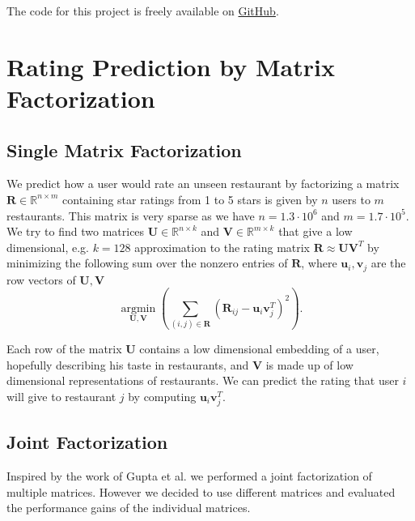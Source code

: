 \documentclass[a4paper]{article}
\begin{document}
The code for this project is freely available on \href{https://github.com/n-gao/yelp-group-recommender}{GitHub}.


\section{Rating Prediction by Matrix Factorization}\label{sec:MatrixFactorization}

\subsection{Single Matrix Factorization}
We predict how a user would rate an unseen restaurant by factorizing a matrix $\mathbf{R} \in \mathbb{R}^{n \times m}$ containing star ratings from 1 to 5 stars is given by $n$ users to $m$ restaurants. This matrix is very sparse as we have $n = 1.3 \cdot 10^6$ and $m = 1.7 \cdot 10^5$.
We try to find two matrices $\mathbf{U} \in \mathbb{R}^{n \times k}$ and  $\mathbf{V} \in \mathbb{R}^{m \times k}$ that give a low dimensional, e.g. $k=128$ approximation to the rating matrix $\mathbf{R} \approx\mathbf{U}\mathbf{V}^T$  by minimizing the following sum over the nonzero entries of $\mathbf{R}$, where $\mathbf{u}_i, \mathbf{v}_j$ are the row vectors of $\mathbf{U}, \mathbf{V}$
\begin{equation}
\underset{\mathbf{U}, \mathbf{V}}{\operatorname{argmin}} \left(
\sum_{(i,j) \in \mathbf{R}} \left(\mathbf{R}_{ij} - \mathbf{u}_i \mathbf{v}_j^T\right)^2 \right).
\end{equation}

Each row of the matrix $\mathbf{U}$ contains a low dimensional embedding of a user, hopefully describing his taste in restaurants, and $\mathbf{V}$ is made up of low dimensional representations of restaurants. We can predict the rating that user $i$ will give to restaurant $j$ by computing $\mathbf{u}_i \mathbf{v}_j^T$.

\subsection{Joint Factorization}\label{subsec:joint}

Inspired by the work of Gupta et al. \cite{gupta2015collective} we performed a joint factorization of multiple matrices. However we decided to use different matrices and evaluated the performance gains of the individual matrices.
\end{document}
